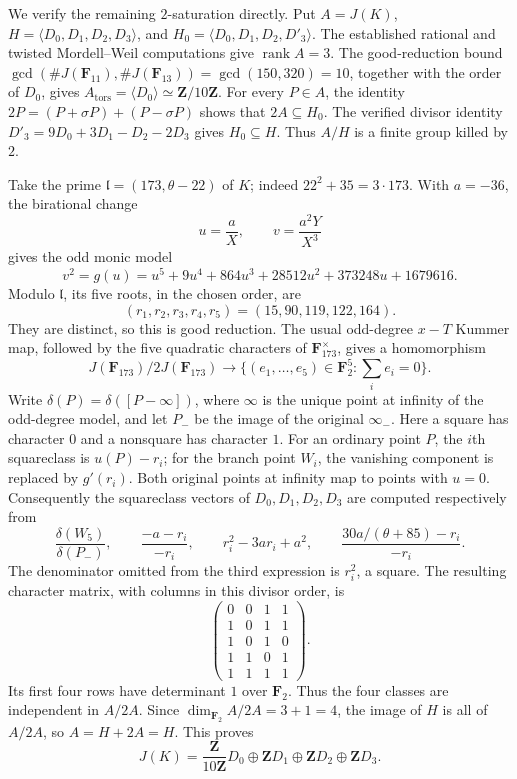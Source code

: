 
We verify the remaining $2$-saturation directly.  Put
$A=J(K)$, $H=\langle D_0,D_1,D_2,D_3\rangle$, and
$H_0=\langle D_0,D_1,D_2,D'_3\rangle$.
The established rational and twisted Mordell--Weil computations give
$\operatorname{rank}A=3$.  The good-reduction bound
$\gcd(\#J(\mathbf F_{11}),\#J(\mathbf F_{13}))=\gcd(150,320)=10$,
together with the order of $D_0$, gives
$A_{\mathrm{tors}}=\langle D_0\rangle\simeq\mathbf Z/10\mathbf Z$.
For every $P\in A$, the identity
$2P=(P+\sigma P)+(P-\sigma P)$ shows that $2A\subseteq H_0$.
The verified divisor identity
$D'_3=9D_0+3D_1-D_2-2D_3$ gives $H_0\subseteq H$.
Thus $A/H$ is a finite group killed by $2$.

Take the prime $\mathfrak l=(173,\theta-22)$ of $K$; indeed
$22^2+35=3\cdot173$.  With $a=-36$, the birational change
\[
 u=\frac aX,\qquad v=\frac{a^2Y}{X^3}
\]
gives the odd monic model
\[
 v^2=g(u)=u^5+9u^4+864u^3+28512u^2+373248u+1679616.
\]
Modulo $\mathfrak l$, its five roots, in the chosen order, are
\[
 (r_1,r_2,r_3,r_4,r_5)=(15,90,119,122,164).
\]
They are distinct, so this is good reduction.  The usual odd-degree
$x-T$ Kummer map, followed by the five quadratic characters of
$\mathbf F_{173}^{\times}$, gives a homomorphism
\[
 J(\mathbf F_{173})/2J(\mathbf F_{173})
 \longrightarrow
 \{(e_1,\ldots,e_5)\in\mathbf F_2^5:\textstyle\sum_i e_i=0\}.
\]
Write $\delta(P)=\delta([P-\infty])$, where $\infty$ is the
unique point at infinity of the odd-degree model, and let $P_-$ be
the image of the original $\infty_-$.
Here a square has character $0$ and a nonsquare has character $1$.
For an ordinary point $P$, the $i$th squareclass is $u(P)-r_i$;
for the branch point $W_i$, the vanishing component is replaced by
$g'(r_i)$.  Both original points at infinity map to points with $u=0$.
Consequently the squareclass vectors of $D_0,D_1,D_2,D_3$ are computed
respectively from
\[
 \frac{\delta(W_5)}{\delta(P_-)},\qquad
 \frac{-a-r_i}{-r_i},\qquad
 r_i^2-3ar_i+a^2,\qquad
 \frac{30a/(\theta+85)-r_i}{-r_i}.
\]
The denominator omitted from the third expression is $r_i^2$, a square.
The resulting character matrix, with columns in this divisor order, is
\[
 \begin{pmatrix}
 0&0&1&1\\
 1&0&1&1\\
 1&0&1&0\\
 1&1&0&1\\
 1&1&1&1
 \end{pmatrix}.
\]
Its first four rows have determinant $1$ over $\mathbf F_2$.
Thus the four classes are independent in $A/2A$.
Since $\dim_{\mathbf F_2}A/2A=3+1=4$, the image of $H$ is all of
$A/2A$, so $A=H+2A=H$.  This proves
\[
 J(K)=\frac{\mathbf Z}{10\mathbf Z}D_0
       \oplus\mathbf ZD_1\oplus\mathbf ZD_2\oplus\mathbf ZD_3.
\]
